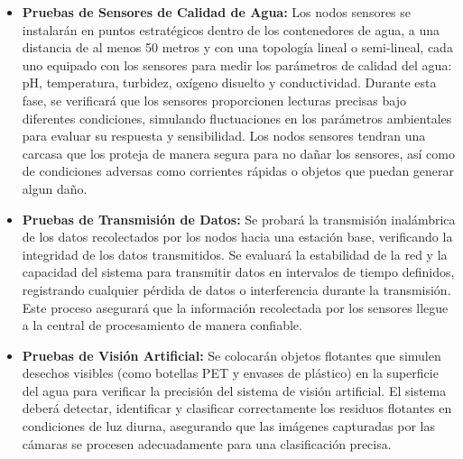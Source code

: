 \begin{itemize}
    \item \textbf{Pruebas de Sensores de Calidad de Agua:} Los nodos sensores se instalarán en puntos estratégicos dentro de los contenedores de agua, a una distancia de al menos 50 metros y con una topología lineal o semi-lineal, cada uno equipado con los sensores para medir los parámetros de calidad del agua: pH, temperatura, turbidez, oxígeno disuelto y conductividad. Durante esta fase, se verificará que los sensores proporcionen lecturas precisas bajo diferentes condiciones, simulando fluctuaciones en los parámetros ambientales para evaluar su respuesta y sensibilidad.
    Los nodos sensores tendran una carcasa que los proteja de manera segura para no dañar los sensores, así como de condiciones adversas como corrientes rápidas o objetos que puedan generar algun daño. 
    
    \item \textbf{Pruebas de Transmisión de Datos:} Se probará la transmisión inalámbrica de los datos recolectados por los nodos hacia una estación base, verificando la integridad de los datos transmitidos. Se evaluará la estabilidad de la red y la capacidad del sistema para transmitir datos en intervalos de tiempo definidos, registrando cualquier pérdida de datos o interferencia durante la transmisión. Este proceso asegurará que la información recolectada por los sensores llegue a la central de procesamiento de manera confiable.

    \item \textbf{Pruebas de Visión Artificial:} Se colocarán objetos flotantes que simulen desechos visibles (como botellas PET y envases de plástico) en la superficie del agua para verificar la precisión del sistema de visión artificial. El sistema deberá detectar, identificar y clasificar correctamente los residuos flotantes en condiciones de luz diurna, asegurando que las imágenes capturadas por las cámaras se procesen adecuadamente para una clasificación precisa.

\end{itemize}

